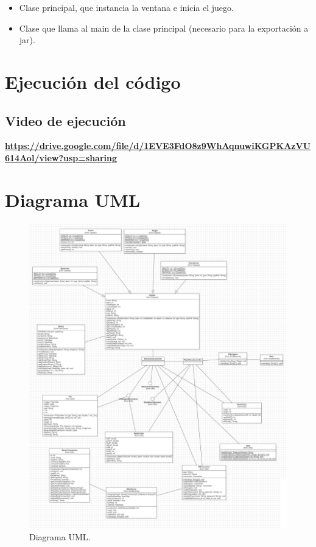 \documentclass{article}
\begin{document}

\begin{itemize}
	\item Clase principal, que instancia la ventana e inicia el juego.
\end{itemize}

\begin{itemize}
	\item Clase que llama al main de la clase principal (necesario para la exportación a jar).
\end{itemize}
\pagebreak

\section{Ejecución del código}
\subsection{Video de ejecución}
\bf{\url{https://drive.google.com/file/d/1EVE3FdO8z9WhAqnuwiKGPKAzVU614Aol/view?usp=sharing}}
\pagebreak

\section{Diagrama UML}
\begin{figure}[H]
	\centering
	\includegraphics[width=1\textwidth,keepaspectratio]{img/uml.png}
	\caption{Diagrama UML.}
\end{figure}
\pagebreak
\end{document}
